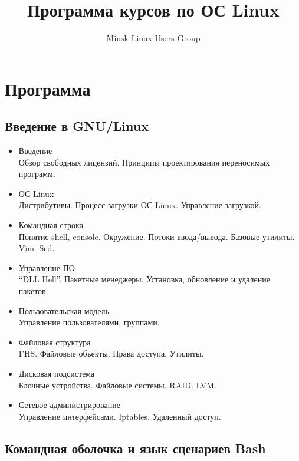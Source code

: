 \documentclass[12pt,a4paper,oneside]{article}
\begin{document}
\title{Программа курсов по ОС Linux}
\author{Minsk Linux Users Group}

\maketitle

\renewcommand{\contentsname}{Оглавление}

\section{Программа}

\subsection{Введение в GNU/Linux}

\begin{itemize}
    \item Введение \\
        Обзор свободных лицензий. Принципы проектирования переносимых программ.
    \item ОС Linux \\
        Дистрибутивы. Процесс загрузки ОС Linux. Управление загрузкой.
    \item Командная строка \\
        Понятие shell, console. Окружение. Потоки ввода/вывода. Базовые утилиты. Vim. Sed.
    \item Управление ПО \\
        ``DLL Hell''. Пакетные менеджеры. Установка, обновление и удаление пакетов.
    \item Пользовательская модель \\
        Управление пользователями, группами.
    \item Файловая структура \\
        FHS. Файловые объекты. Права доступа. Утилиты.
    \item Дисковая подсистема \\
        Блочные устройства. Файловые системы. RAID. LVM.
    \item Сетевое администрирование \\
        Управление интерфейсами. Iptables. Удаленный доступ.
\end{itemize}

\subsection{Командная оболочка и язык сценариев Bash}
\end{document}
